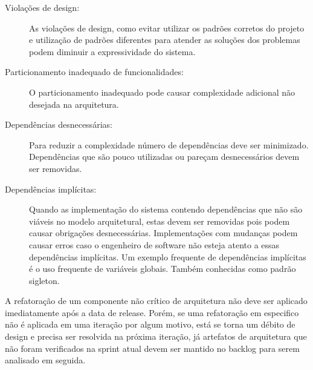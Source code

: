 \begin{description}
\item[Violações de design:]
As violações de design, como evitar utilizar os padrões corretos do projeto e utilização de padrões diferentes para atender as soluções dos problemas podem diminuir a expressividade do sistema.

\item[Particionamento inadequado de funcionalidades:]
O particionamento inadequado pode causar complexidade adicional não desejada na arquitetura.

\item[Dependências desnecessárias:]
Para reduzir a complexidade número de dependências deve ser minimizado. Dependências que são pouco utilizadas ou pareçam desnecessários devem ser removidas.

\item[Dependências implícitas:]
Quando as implementação do sistema contendo dependências que não são viáveis no modelo arquitetural, estas devem ser removidas pois podem causar obrigações desnecessárias. Implementações com mudanças podem causar erros caso o engenheiro de software não esteja atento a essas dependências implícitas. Um exemplo frequente de dependências implícitas é o uso frequente de variáveis globais. Também conhecidas como padrão sigleton.

\end{description}

A refatoração de um componente não crítico de arquitetura não deve ser aplicado imediatamente após a data de release. Porém, se uma refatoração em especifico não é aplicada em uma iteração por algum motivo, está se torna um débito de design e precisa ser resolvida na próxima iteração, já artefatos de arquitetura que não foram verificados na sprint atual devem ser mantido no backlog para serem analisado em seguida.

